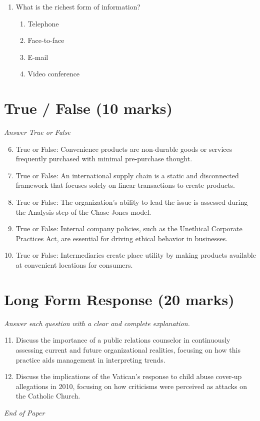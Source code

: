 \documentclass[12pt]{article}
\begin{document}
\begin{enumerate}[label=\arabic*.]
\begin{enumerate}[label=(\alph*)]
    \item Social
    \item Business
    \item Organisational
    \item Company
\end{enumerate}
\item What is the richest form of information?
\begin{enumerate}[label=(\alph*)]
    \item Telephone
    \item Face-to-face
    \item E-mail
    \item Video conference
\end{enumerate}
\end{enumerate}

\section*{True / False (10 marks)}
\textit{Answer True or False}
\begin{enumerate}[label=\arabic*.]
\setcounter{enumi}{5}
\item True or False: Convenience products are non-durable goods or services frequently purchased with minimal pre-purchase thought.
\item True or False: An international supply chain is a static and disconnected framework that focuses solely on linear transactions to create products.
\item True or False: The organization's ability to lead the issue is assessed during the Analysis step of the Chase Jones model.
\item True or False: Internal company policies, such as the Unethical Corporate Practices Act, are essential for driving ethical behavior in businesses.
\item True or False: Intermediaries create place utility by making products available at convenient locations for consumers.
\end{enumerate}

\section*{Long Form Response (20 marks)}
\textit{Answer each question with a clear and complete explanation.}
\begin{enumerate}[label=\arabic*.]
\setcounter{enumi}{10}
\item Discuss the importance of a public relations counselor in continuously assessing current and future organizational realities, focusing on how this practice aids management in interpreting trends.
\item Discuss the implications of the Vatican's response to child abuse cover-up allegations in 2010, focusing on how criticisms were perceived as attacks on the Catholic Church.
\end{enumerate}

\vfill
\noindent\textit{End of Paper}
\end{document}
